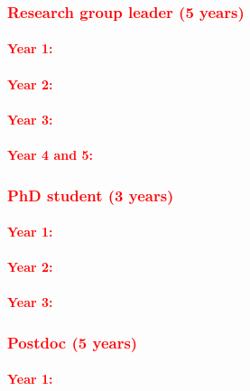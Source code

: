 \documentclass[a4paper,11pt,numbers=noenddot,parskip=half-]{scrreprt}
\begin{document}
\subsubsection{\textcolor{red}{Research group leader (5 years)}}
\paragraph*{\textcolor{red}{Year 1:}}
\myblindtext
\paragraph*{\textcolor{red}{Year 2:}}
\myblindtext
\paragraph*{\textcolor{red}{Year 3:}}
\myblindtext
\paragraph*{\textcolor{red}{Year 4 and 5:}}
\myblindtext


\subsubsection{\textcolor{red}{PhD student (3 years)}}\label{sec:phd}
\paragraph*{\textcolor{red}{Year 1:}}
\myblindtext
\paragraph*{\textcolor{red}{Year 2:}}
\myblindtext
\paragraph*{\textcolor{red}{Year 3:}}
\myblindtext

\subsubsection{\textcolor{red}{Postdoc (5 years)}}
\paragraph*{\textcolor{red}{Year 1:}}
\myblindtext
\end{document}

